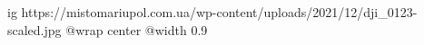  
 
 
 
 

\ifcmt
  ig https://mistomariupol.com.ua/wp-content/uploads/2021/12/dji_0123-scaled.jpg
  @wrap center
  @width 0.9
\fi
